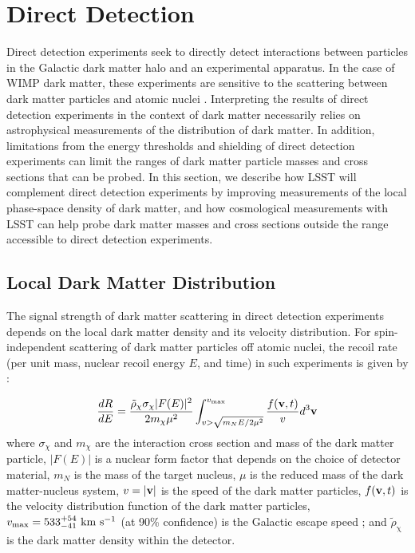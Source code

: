 \section{Direct Detection }
\label{sec:direct}

Direct detection experiments seek to directly detect interactions between particles in the Galactic dark matter halo and an experimental apparatus. In the case of WIMP dark matter, these experiments are sensitive to the scattering between dark matter particles and atomic nuclei \citep[\eg,][]{1509.08767}.
Interpreting the results of direct detection experiments in the context of dark matter necessarily relies on astrophysical measurements of the distribution of dark matter.
In addition, limitations from the energy thresholds and shielding of direct detection experiments can limit the ranges of dark matter particle masses and cross sections that can be probed.
In this section, we describe how LSST will complement direct detection experiments by improving measurements of the local phase-space density of dark matter, and how cosmological measurements with LSST can help probe dark matter  masses and cross sections outside the range accessible to direct detection experiments.


\subsection{Local Dark Matter Distribution }

\def\rhodm{\rho_\mathrm{\chi}}
\def\rhodmlab{\tilde{\rho}_\mathrm{\chi}}
\def\rhodmext{\rho_\mathrm{\chi,ext}}

The signal strength of dark matter scattering in direct detection experiments depends on the local dark matter density and its velocity distribution. 
For spin-independent scattering of dark matter particles off atomic nuclei, the recoil rate (per unit mass, nuclear recoil energy $E$, and time) in such experiments is given by \citep[\eg,][]{1996APh.....6...87L}: 

\begin{equation}
\frac{dR}{dE} = \frac{\rhodmlab \sigma_\chi |F(E)|^2}{2 m_\chi \mu^2} \int_{v>\sqrt{m_N E/2\mu^2}}^{v_\mathrm{max}} \frac{f({\bf v},t)}{v}d^3 {\bf v} 
\label{eqn:recoilrate} 
\end{equation} 
where $\sigma_\chi$ and $m_\chi$ are the interaction cross section and mass of the dark matter particle, $|F(E)|$ is a nuclear form factor that depends on the choice of detector material, $m_N$ is the mass of the target nucleus, $\mu$ is the reduced mass of the dark matter-nucleus system, $v = |{\bf v}|$ is the speed of the dark matter particles, $f({\bf v},t)$ is the velocity distribution function of the dark matter particles, $v_\mathrm{max} = 533^{+54}_{-41}\mathrm{\,\mathrm{\,km}\,\mathrm{\,s}^{-1}}$ (at 90\% confidence) is the Galactic escape speed \citep{2014AA...562A..91P}; and $\rhodmlab$ is the dark matter density within the detector. 
 

